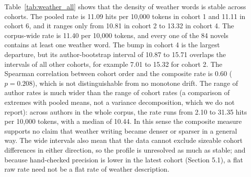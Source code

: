 \documentclass[11pt]{article}
\begin{document}
Table~\ref{tab:weather_all} shows that the density of weather words is stable across cohorts. The pooled rate is 11.09 hits per 10,000 tokens in cohort 1 and 11.11 in cohort 6, and it ranges only from 10.81 in cohort 2 to 13.32 in cohort 4.
The corpus-wide rate is 11.40 per 10,000 tokens, and every one of the 84 novels contains at least one weather word.
The bump in cohort 4 is the largest departure, but its author-bootstrap interval of 10.87 to 15.71 overlaps the intervals of all other cohorts, for example 7.01 to 15.32 for cohort 2.
The Spearman correlation between cohort order and the composite rate is 0.60 ($p=0.208$), which is not distinguishable from no monotone drift.
The range of author rates is much wider than the range of cohort rates (a comparison of extremes with pooled means, not a variance decomposition, which we do not report): across authors in the whole corpus, the rate runs from 2.10 to 31.35 hits per 10,000 tokens, with a median of 10.44.
In this sense the composite measure supports no claim that weather writing became denser or sparser in a general way. The wide intervals also mean that the data cannot exclude sizeable cohort differences in either direction, so the profile is unresolved as much as stable; and because hand-checked precision is lower in the latest cohort (Section 5.1), a flat raw rate need not be a flat rate of weather description.


\end{document}
